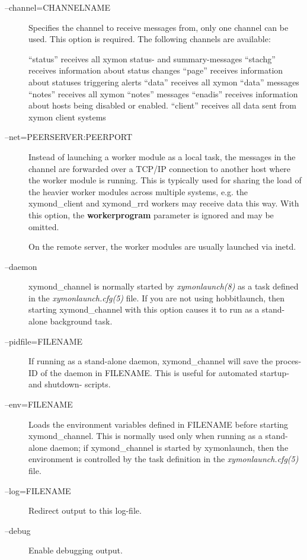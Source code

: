  \begin{description}
\item[--channel=CHANNELNAME] Specifies the channel to receive messages
  from, only one channel can be used. This option is required. The
  following channels are available:  

 ``status'' receives all xymon status- and summary-messages  
 ``stachg'' receives information about status changes  
 ``page'' receives information about statuses triggering alerts  
 ``data'' receives all xymon ``data'' messages  
 ``notes'' receives all xymon ``notes'' messages  
 ``enadis'' receives information about hosts being disabled or enabled.  
 ``client'' receives all data sent from xymon client systems 

 

\item[--net=PEERSERVER:PEERPORT] Instead of launching a worker module
  as a local task, the messages in the channel are forwarded over a
  TCP/IP connection to another host where the worker module is
  running. This is typically used for sharing the load of the heavier
  worker modules across multiple systems, e.g. the xymond\_client and
  xymond\_rrd workers may receive data this way. With this option,
  the \textbf{workerprogram} parameter is ignored and may be omitted.  

 On the remote server, the worker modules are usually launched via inetd. 

 

\item[--daemon] xymond\_channel is normally started by
  \emph{xymonlaunch(8)} as a task defined in the
  \emph{xymonlaunch.cfg(5)} file. If you are not using hobbitlaunch,
  then starting xymond\_channel with this option causes it to run as
  a stand-alone background task. 


 

\item[--pidfile=FILENAME] If running as a stand-alone daemon,
  xymond\_channel will save the proces-ID of the daemon in
  FILENAME. This is useful for automated startup- and shutdown-
  scripts. 


 

\item[--env=FILENAME] Loads the environment variables defined in
  FILENAME before starting xymond\_channel. This is normally used
  only when running as a stand-alone daemon; if xymond\_channel is
  started by xymonlaunch, then the environment is controlled by the
  task definition in the \emph{xymonlaunch.cfg(5)} file. 

 

\item[--log=FILENAME] Redirect output to this log-file. 

 

\item[--debug] Enable debugging output. 

 


\end{description}

